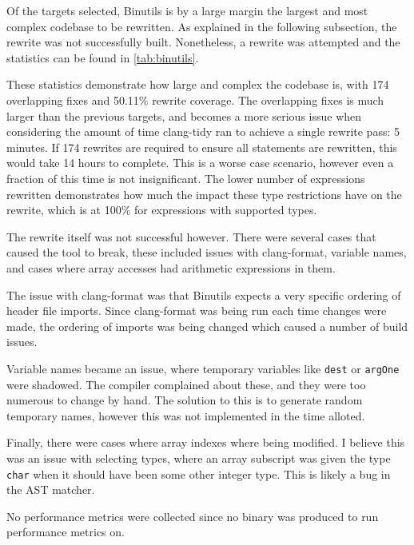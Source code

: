 Of the targets selected, Binutils is by a large margin the largest and most complex codebase to be rewritten. As explained in the following subsection, the rewrite was not successfully built. Nonetheless, a rewrite was attempted and the statistics can be found in \ref{tab:binutils}.

These statistics demonstrate how large and complex the codebase is, with 174 overlapping fixes and 50.11\% rewrite coverage. The overlapping fixes is much larger than the previous targets, and becomes a more serious issue when considering the amount of time clang-tidy ran to achieve a single rewrite pass: 5 minutes. If 174 rewrites are required to ensure all statements are rewritten, this would take 14 hours to complete. This is a worse case scenario, however even a fraction of this time is not insignificant. The lower number of expressions rewritten demonstrates how much the impact these type restrictions have on the rewrite, which is at 100\% for expressions with supported types.

The rewrite itself was not successful however. There were several cases that caused the tool to break, these included issues with clang-format, variable names, and cases where array accesses had arithmetic expressions in them.

The issue with clang-format was that Binutils expects a very specific ordering of header file imports. Since clang-format was being run each time changes were made, the ordering of imports was being changed which caused a number of build issues.

Variable names became an issue, where temporary variables like \texttt{dest} or \texttt{argOne} were shadowed. The compiler complained about these, and they were too numerous to change by hand. The solution to this is to generate random temporary names, however this was not implemented in the time alloted.

Finally, there were cases where array indexes where being modified. I believe this was an issue with selecting types, where an array subscript was given the type \texttt{char} when it should have been some other integer type. This is likely a bug in the AST matcher.

No performance metrics were collected since no binary was produced to run performance metrics on.

